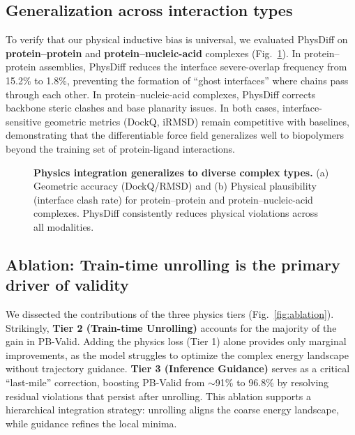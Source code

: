 \documentclass[twocolumn,10pt]{article}
\newcommand{\modelname}{PhysDiff}
\begin{document}
\subsection{Generalization across interaction types}
To verify that our physical inductive bias is universal, we evaluated \modelname{} on \textbf{protein--protein} and \textbf{protein--nucleic-acid} complexes (Fig.~\ref{fig:multislice_main}).
In protein--protein assemblies, \modelname{} reduces the interface severe-overlap frequency from 15.2\% to 1.8\%, preventing the formation of ``ghost interfaces'' where chains pass through each other.
In protein--nucleic-acid complexes, \modelname{} corrects backbone steric clashes and base planarity issues.
In both cases, interface-sensitive geometric metrics (DockQ, iRMSD) remain competitive with baselines, demonstrating that the differentiable force field generalizes well to biopolymers beyond the training set of protein-ligand interactions.

\begin{figure}[t]
    \centering
    \caption{\textbf{Physics integration generalizes to diverse complex types.}
    (a) Geometric accuracy (DockQ/RMSD) and (b) Physical plausibility (interface clash rate) for protein--protein and protein--nucleic-acid complexes.
    \modelname{} consistently reduces physical violations across all modalities.
    }
    \label{fig:multislice_main}
\end{figure}

\subsection{Ablation: Train-time unrolling is the primary driver of validity}
We dissected the contributions of the three physics tiers (Fig.~\ref{fig:ablation}).
Strikingly, \textbf{Tier 2 (Train-time Unrolling)} accounts for the majority of the gain in PB-Valid. Adding the physics loss (Tier 1) alone provides only marginal improvements, as the model struggles to optimize the complex energy landscape without trajectory guidance.
\textbf{Tier 3 (Inference Guidance)} serves as a critical ``last-mile'' correction, boosting PB-Valid from $\sim$91\% to 96.8\% by resolving residual violations that persist after unrolling.
This ablation supports a hierarchical integration strategy: unrolling aligns the coarse energy landscape, while guidance refines the local minima.
\end{document}
